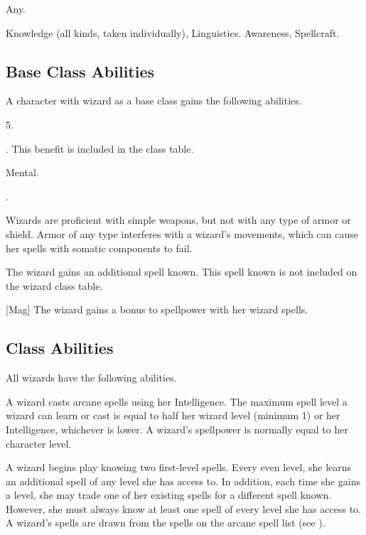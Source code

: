      Any.

     Knowledge (all kinds, taken individually), Linguistics.
     Awareness, Spellcraft.

    \subsection{Base Class Abilities}
        A character with wizard as a base class gains the following abilities.

         5.

         . This benefit is included in the class table.

          Mental.

         .

        Wizards are proficient with simple weapons, but not with any type of armor or shield.
        Armor of any type interferes with a wizard's movements, which can cause her spells with somatic components to fail.

        The wizard gains an additional spell known.
        This spell known is not included on the wizard class table.

        [Mag]
        The wizard gains a  bonus to spellpower with her wizard spells.

    \subsection{Class Abilities}
        All wizards have the following abilities.

        A wizard casts arcane spells using her Intelligence.
        The maximum spell level a wizard can learn or cast is equal to half her wizard level (minimum 1) or her Intelligence, whichever is lower.
        A wizard's spellpower is normally equal to her character level.

        A wizard begins play knowing two first-level spells.
        Every even level, she learns an additional spell of any level she has access to.
        In addition, each time she gains a level, she may trade one of her existing spells for a different spell known.
        However, she must always know at least one spell of every level she has access to.
        A wizard's spells are drawn from the spells on the arcane spell list (see ).

